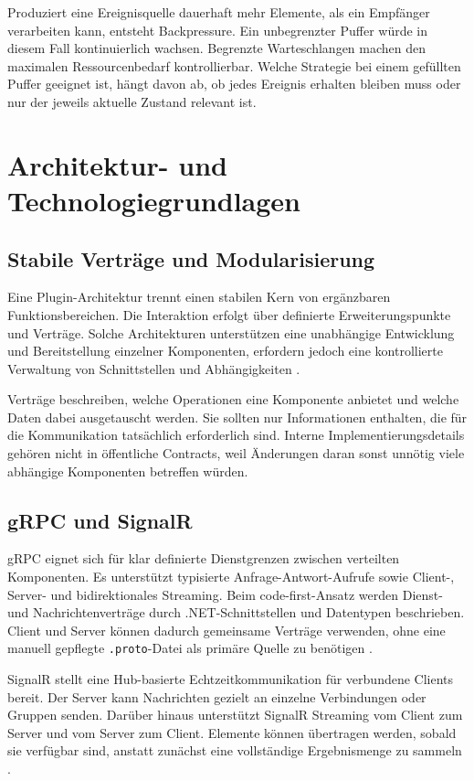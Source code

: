 Produziert eine Ereignisquelle dauerhaft mehr Elemente, als ein Empfänger verarbeiten kann, entsteht Backpressure. Ein unbegrenzter Puffer würde in diesem Fall kontinuierlich wachsen. Begrenzte Warteschlangen machen den maximalen Ressourcenbedarf kontrollierbar. Welche Strategie bei einem gefüllten Puffer geeignet ist, hängt davon ab, ob jedes Ereignis erhalten bleiben muss oder nur der jeweils aktuelle Zustand relevant ist.

\section{Architektur- und Technologiegrundlagen}

\subsection{Stabile Verträge und Modularisierung}

Eine Plugin-Architektur trennt einen stabilen Kern von ergänzbaren Funktionsbereichen. Die Interaktion erfolgt über definierte Erweiterungspunkte und Verträge. Solche Architekturen unterstützen eine unabhängige Entwicklung und Bereitstellung einzelner Komponenten, erfordern jedoch eine kontrollierte Verwaltung von Schnittstellen und Abhängigkeiten \cite{buschmannPOSA}.

Verträge beschreiben, welche Operationen eine Komponente anbietet und welche Daten dabei ausgetauscht werden. Sie sollten nur Informationen enthalten, die für die Kommunikation tatsächlich erforderlich sind. Interne Implementierungsdetails gehören nicht in öffentliche Contracts, weil Änderungen daran sonst unnötig viele abhängige Komponenten betreffen würden.

\subsection{gRPC und SignalR}

gRPC eignet sich für klar definierte Dienstgrenzen zwischen verteilten Komponenten. Es unterstützt typisierte Anfrage-Antwort-Aufrufe sowie Client-, Server- und bidirektionales Streaming. Beim code-first-Ansatz werden Dienst- und Nachrichtenverträge durch .NET-Schnittstellen und Datentypen beschrieben. Client und Server können dadurch gemeinsame Verträge verwenden, ohne eine manuell gepflegte \texttt{.proto}-Datei als primäre Quelle zu benötigen \cite{microsoftGrpcCodeFirst}.

SignalR stellt eine Hub-basierte Echtzeitkommunikation für verbundene Clients bereit. Der Server kann Nachrichten gezielt an einzelne Verbindungen oder Gruppen senden. Darüber hinaus unterstützt SignalR Streaming vom Client zum Server und vom Server zum Client. Elemente können übertragen werden, sobald sie verfügbar sind, anstatt zunächst eine vollständige Ergebnismenge zu sammeln \cite{microsoftSignalRHubs,microsoftSignalRStreaming}.

